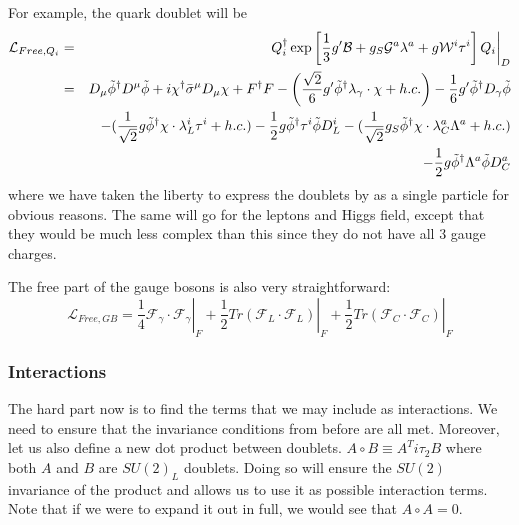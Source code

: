     For example, the quark doublet will be
    \begin{eqnarray}
      \mathcal{L}_{Free, Q_i} &=& \left.Q_i^\dagger \exp\left[\frac{1}{3} g^\prime \mathcal{B} + g_S \mathcal{G}^a \lambda^a + g \mathcal{W}^i \tau^i \right] Q_i \right\vert_D \nonumber \\
      &=& D_\mu \tilde{\phi}^\dagger D^\mu \tilde{\phi} + i \chi^\dagger \bar{\sigma}^\mu D_\mu \chi + F^\dagger F - \left(\frac{\sqrt{2}}{6} g^\prime \tilde{\phi}^\dagger \lambda_\gamma \cdot \chi + h.c. \right) - \frac{1}{6} g^\prime \tilde{\phi}^\dagger D_\gamma \tilde{\phi} \nonumber \\
      && - (\frac{1}{\sqrt{2}} g \tilde{\phi}^\dagger \chi\cdot\lambda^i_L \tau^i + h.c.) - \frac{1}{2} g \tilde{\phi}^\dagger \tau^i \tilde{\phi} D^i_L - (\frac{1}{\sqrt{2}} g_S \tilde{\phi}^\dagger \chi\cdot\lambda^a_C \Lambda^a + h.c.) \nonumber \\
      && - \frac{1}{2} g \tilde{\phi}^\dagger \Lambda^a \tilde{\phi} D^a_C
    \end{eqnarray}
    where we have taken the liberty to express the doublets by as a single particle for obvious reasons. The same will go for the leptons and Higgs field, except that they would be much less complex than this since they do not have all 3 gauge charges.

    The free part of the gauge bosons is also very straightforward:
    \begin{equation}
      \mathcal{L}_{Free, GB} = \left. \frac{1}{4} \mathcal{F}_\gamma \cdot \mathcal{F}_\gamma \right\vert_F + \left. \frac{1}{2} Tr \left( \mathcal{F}_L \cdot \mathcal{F}_L \right) \right\vert_F + \left. \frac{1}{2} Tr \left( \mathcal{F}_C \cdot \mathcal{F}_C \right) \right\vert_F
    \end{equation}

    \subsubsection{Interactions}
    \label{ch:15:building the mssm:lagrangian:interactions}
    The hard part now is to find the terms that we may include as interactions. We need to ensure that the invariance conditions from before are all met. Moreover, let us also define a new dot product between doublets. $A \circ B \equiv A^T i \tau_2 B$ where both $A$ and $B$ are $SU(2)_L$ doublets. Doing so will ensure the $SU(2)$ invariance of the product and allows us to use it as possible interaction terms. Note that if we were to expand it out in full, we would see that $A \circ A = 0$.

